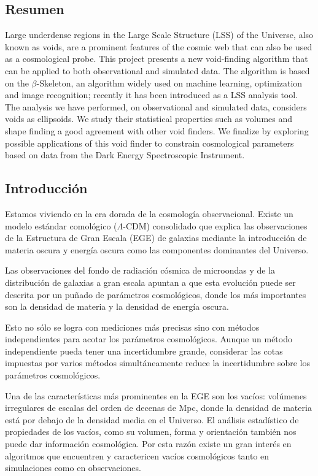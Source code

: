 \documentclass[manuscript]{aastex62}
\begin{document}
\subsection{Resumen}
Large underdense regions in the Large Scale Structure (LSS) of the Universe, also known as voids,
are a prominent features of the cosmic web that can also be used as a cosmological probe.
This project presents a new void-finding algorithm that can be applied
to both observational and simulated data.
The algorithm is based on the $\beta$-Skeleton, an algorithm widely used on 
machine learning, optimization and image recognition;  recently it has been introduced as a 
LSS analysis tool.
The analysis we have performed, on observational and simulated data, considers voids as ellipsoids.
We study their statistical properties such as volumes and shape finding a good agreement with other void finders.
We finalize by exploring possible applications of this void finder to constrain cosmological
parameters based on data from the Dark Energy Spectroscopic Instrument.

\subsection{Introducción}

Estamos viviendo en la era dorada de la cosmolog\'ia observacional.
Existe un modelo est\'andar comol\'ogico ($\Lambda$-CDM) consolidado 
que explica las observaciones de la Estructura de Gran Escala (EGE) de galaxias mediante
la introducci\'on de materia oscura y energ\'ia oscura como las componentes
dominantes del Universo.

Las observaciones del fondo de radiaci\'on c\'osmica de microondas
\citep{WMAP2013} y de la distribuci\'on de galaxias a gran escala
\citep{SDSS-DR14-2017} apuntan a que esta evoluci\'on puede ser descrita
por un pu\~nado de par\'ametros cosmol\'ogicos, donde los m\'as
importantes son la densidad de materia y la densidad de energ\'ia
oscura. 

Esto no s\'olo se logra con mediciones m\'as precisas sino con
m\'etodos independientes para acotar los par\'ametros
cosmol\'ogicos.
Aunque un m\'etodo independiente pueda tener una incertidumbre
grande, considerar las cotas impuestas por varios m\'etodos
simult\'aneamente reduce la incertidumbre sobre los par\'ametros
cosmol\'ogicos.


Una de las caracter\'isticas m\'as prominentes en la EGE son los vac\'ios: vol\'umenes
irregulares de escalas del orden de decenas de Mpc, donde la densidad de materia est\'a
por debajo de la densidad media en el Universo. El an\'alisis estad\'istico de propiedades
de los vac\'ios, como su volumen, forma y orientaci\'on tambi\'en nos puede dar informaci\'on
cosmol\'ogica. Por esta raz\'on existe un gran inter\'es en algoritmos que encuentren y
caractericen vac\'ios cosmol\'ogicos tanto en simulaciones como en observaciones.
\end{document}
